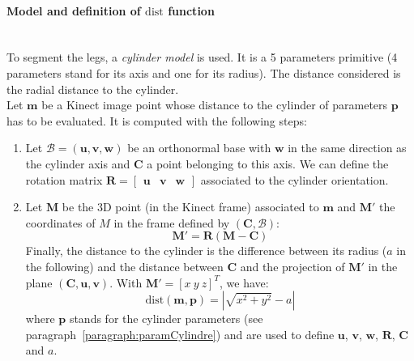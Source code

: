 \documentclass[letterpaper, 10 pt, conference]{ieeeconf}
\newcommand{\CDOK}[2]{{#1}} %
\begin{document}
\paragraph{Model and definition of $\mathrm{dist}$ function}~\\
\label{paragraph:paramCylindre}
To segment the legs, a \emph{cylinder model} is used. It is a 5 parameters primitive (4 parameters stand for its axis and one for its radius). The distance considered is the radial distance to the cylinder. \\
 Let $\mathbf{m}$ be a Kinect image point whose distance to the cylinder of parameters $\mathbf{p}$ has to be evaluated. It is computed with the following steps:
\begin{enumerate}
	\item Let $\mathcal{B}=(\mathbf{u},\mathbf{v},\mathbf{w})$ be an orthonormal base with $\mathbf{w}$ in the same direction \CDOK{as}{than} the cylinder axis and  $\mathbf{C}$ a point belonging to this axis. \CDOK{We can define the rotation matrix $\mathbf{R} = \begin{bmatrix}\mathbf{u} & \mathbf{v} & \mathbf{w}\end{bmatrix}$ associated to the cylinder orientation.}{The rotation matrix $\mathbf{R}$  $(\mathbf{x},\mathbf{y},\mathbf{z})$ initiale à $\mathcal{B}$:
	\begin{equation}
		\mathbf{R} = 
		\begin{bmatrix}
			\mathbf{u} & \mathbf{v} & \mathbf{w}
		\end{bmatrix}
	\end{equation}}
	\item Let $\mathbf{M}$ be the 3D point (in the Kinect frame) associated to $\mathbf{m}$ and $\mathbf{M}'$ the coordinates of $M$ in the frame defined by $(\mathbf{C},\mathcal{B})$:
	\begin{equation}
		\mathbf{M}' = \mathbf{R}\left(\mathbf{M}-\mathbf{C}\right)
	\end{equation}
	Finally, the distance to the cylinder is the difference between its radius ($a$ in the following) and the distance between $\mathbf{C}$ and the projection of $\mathbf{M}'$ in the plane $(\mathbf{C},\mathbf{u},\mathbf{v})$. With $\mathbf{M}'=[x\ y\ z]^T$, we have:
	\begin{equation}
		\mathrm{dist}(\mathbf{m},\mathbf{p}) = |\sqrt{x^2+y^2} - a|
	\end{equation}
	where $\mathbf{p}$ stands for the cylinder parameters (see paragraph~\ref{paragraph:paramCylindre}) and are used to define $\mathbf{u}$, $\mathbf{v}$, $\mathbf{w}$, $\mathbf{R}$, $\mathbf{C}$ and $a$.
\end{enumerate}
\end{document}
